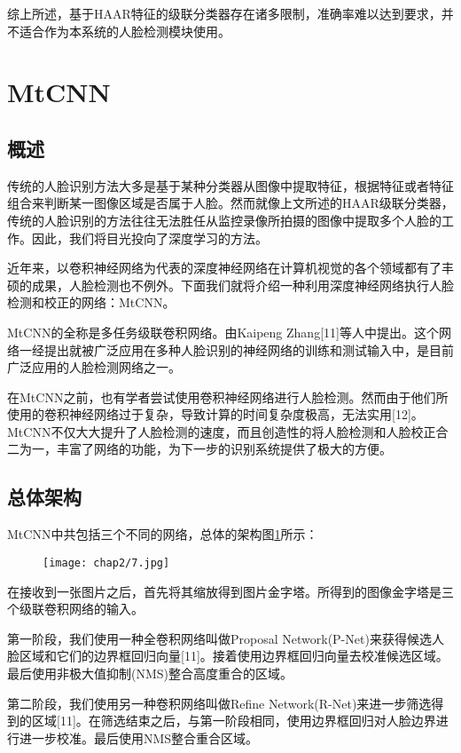 综上所述，基于HAAR特征的级联分类器存在诸多限制，准确率难以达到要求，并不适合作为本系统的人脸检测模块使用。


\section{MtCNN}

\subsection{概述}

传统的人脸识别方法大多是基于某种分类器从图像中提取特征，根据特征或者特征组合来判断某一图像区域是否属于人脸。然而就像上文所述的HAAR级联分类器，传统的人脸识别的方法往往无法胜任从监控录像所拍摄的图像中提取多个人脸的工作。因此，我们将目光投向了深度学习的方法。

近年来，以卷积神经网络为代表的深度神经网络在计算机视觉的各个领域都有了丰硕的成果，人脸检测也不例外。下面我们就将介绍一种利用深度神经网络执行人脸检测和校正的网络：MtCNN。

MtCNN的全称是多任务级联卷积网络。由Kaipeng Zhang[11]等人中提出。这个网络一经提出就被广泛应用在多种人脸识别的神经网络的训练和测试输入中，是目前广泛应用的人脸检测网络之一。

在MtCNN之前，也有学者尝试使用卷积神经网络进行人脸检测。然而由于他们所使用的卷积神经网络过于复杂，导致计算的时间复杂度极高，无法实用[12]。MtCNN不仅大大提升了人脸检测的速度，而且创造性的将人脸检测和人脸校正合二为一，丰富了网络的功能，为下一步的识别系统提供了极大的方便。

\subsection{总体架构}

MtCNN中共包括三个不同的网络，总体的架构图\ref{fig:mtcnn}所示：

\begin{figure}[!htp]
	\centering
	\texttt{[image: chap2/7.jpg]}
	\label{fig:mtcnn}
\end{figure}

在接收到一张图片之后，首先将其缩放得到图片金字塔。所得到的图像金字塔是三个级联卷积网络的输入。

第一阶段，我们使用一种全卷积网络叫做Proposal Network(P-Net)来获得候选人脸区域和它们的边界框回归向量[11]。接着使用边界框回归向量去校准候选区域。最后使用非极大值抑制(NMS)整合高度重合的区域。

第二阶段，我们使用另一种卷积网络叫做Refine Network(R-Net)来进一步筛选得到的区域[11]。在筛选结束之后，与第一阶段相同，使用边界框回归对人脸边界进行进一步校准。最后使用NMS整合重合区域。

